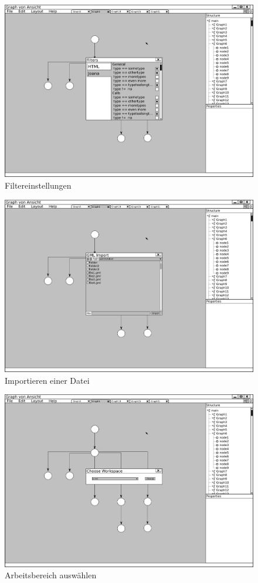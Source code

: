 \begin{figure}[ht]
  \centering
  \includegraphics[width=380pt]{resourcen/gui_window_filters.png}
  \caption{Filtereinstellungen}
  \label{fig:gui_window_filters}
\end{figure}

\begin{figure}[hb]
  \centering
  \includegraphics[width=380pt]{resourcen/gui_window_import.png}
  \caption{Importieren einer Datei}
  \label{fig:gui_window_import}
\end{figure}

\begin{figure}[ht]
  \centering
  \includegraphics[width=380pt]{resourcen/gui_window_chooseWorkspace.png}
  \caption{Arbeitsbereich auswählen}
  \label{fig:gui_window_chooseWorkspace}
\end{figure}

